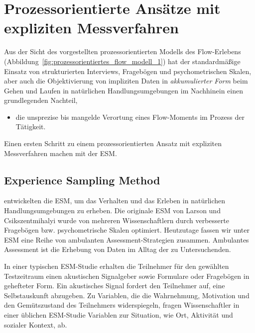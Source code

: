 

\section{Prozessorientierte Ansätze mit expliziten Messverfahren} 

\label{sec:prozessorientierte_ansatze_mit_expliziten_messverfahren}

Aus der Sicht des vorgestellten prozessorientierten Modells des Flow-Erlebens (Abbildung~\ref{fig:prozessorientiertes_flow_modell_1}) hat der standardmäßige Einsatz von strukturierten Interviews, Fragebögen und psychometrischen Skalen, aber auch die Objektivierung von impliziten Daten in \emph{akkumulierter Form} beim Gehen und Laufen in natürlichen Handlungsumgebungen im Nachhinein einen grundlegenden Nachteil,
\begin{itemize}
	\item die unsprezise bis mangelde Verortung eines Flow-Moments im Prozess der Tätigkeit. 
\end{itemize}

Einen ersten Schritt zu einem prozessorientierten Ansatz mit expliziten Messverfahren machen \citet{Larson1983} mit der \ac{ESM}.

\subsection{Experience Sampling Method} 

\label{sub:experience_sampling_method}

\citet{Larson1983} entwickelten die \ac{ESM}, um das Verhalten und das Erleben in natürlichen Handlungsumgebungen zu erheben. Die originale \ac{ESM} von Larson und Csikszentmihalyi wurde von mehreren Wissenschaftlern \citep[z.~B.][]{Schallberger2001, Rheinberg2003} durch verbesserte Fragebögen bzw. psychometrische Skalen optimiert. Heutzutage fassen wir unter \ac{ESM} eine Reihe von ambulanten Assessment-Strategien zusammen. Ambulantes Assessment ist die Erhebung von Daten im Alltag der zu Untersuchenden.

In einer typischen \ac{ESM}-Studie erhalten die Teilnehmer für den gewählten Testzeitraum einen akustischen Signalgeber sowie Formulare oder Fragebögen in gehefteter Form. Ein akustisches Signal fordert den Teilnehmer auf, eine Selbstauskunft abzugeben. Zu Variablen, die die Wahrnehmung, Motivation und den Gemütszustand des Teilnehmers widerspiegeln, fragen Wissenschaftler in einer üblichen \ac{ESM}-Studie Variablen zur Situation, wie Ort, Aktivität und sozialer Kontext, ab. 

